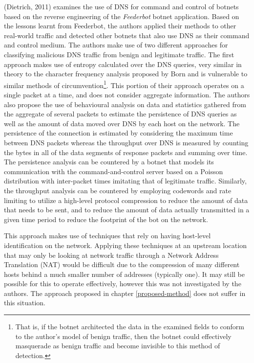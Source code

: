 \documentclass[12pt]{report}
\theoremstyle{remark}
\theoremstyle{definition}
\theoremstyle{definition}
\theoremstyle{definition}
\begin{document}
(Dietrich, 2011)\cite{Dietrich2011} examines the use of DNS for command and
control of botnets based on the reverse engineering of the \emph{Feederbot}
botnet application. Based on the lessons learnt from Feederbot, the authors
applied their methods to other real-world traffic and detected other botnets
that also use DNS as their command and control medium. The authors make use of
two different approaches for classifying malicious DNS traffic from benign and
legitimate traffic. The first approach makes use of entropy calculated over the
DNS queries, very similar in theory to the character frequency analysis proposed
by Born\cite{Born2010.cfa} and is vulnerable to similar methods of
circumvention\footnote{That is, if the botnet architected the data in the
examined fields to conform to the author's model of benign traffic, then the
botnet could effectively masquerade as benign traffic and become invisible to
this method of detection.}. This portion of their approach operates on a single
packet at a time, and does not consider aggregate information. The authors also
propose the use of behavioural analysis on data and statistics gathered from the
aggregate of several packets to estimate the persistence of DNS queries as well
as the amount of data moved over DNS by each host on the network. The
persistence of the connection is estimated by considering the maximum time
between DNS packets whereas the throughput over DNS is measured by counting the
bytes in all of the data segments of response packets and summing over time. The
persistence analysis can be countered by a botnet that models its communication
with the command-and-control server based on a Poisson distribution with
inter-packet times imitating that of legitimate traffic. Similarly, the
throughput analysis can be countered by employing codewords and rate limiting to
utilize a high-level protocol compression to reduce the amount of data that
needs to be sent, and to reduce the amount of data actually transmitted in a
given time period to reduce the footprint of the bot on the network.

This approach makes use of techniques that rely on having host-level
identification on the network. Applying these techniques at an upstream location
that may only be looking at network traffic through a Network Address
Translation (NAT) would be difficult due to the compression of many different
hosts behind a much smaller number of addresses (typically one). It may still be
possible for this to operate effectively, however this was not investigated by
the authors. The approach proposed in chapter \ref{proposed-method} does not
suffer in this situation.
\end{document}
